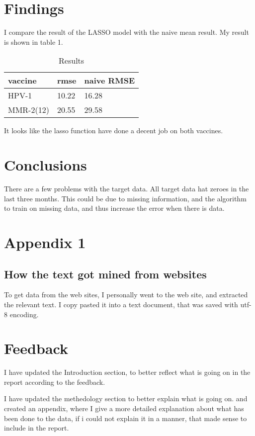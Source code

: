 \documentclass{sig-alternate}
\begin{document}
\section{Findings}
I compare the result of the LASSO model with the naive mean result.
My result is shown in table 1.
\begin{table}[!h]
\centering
\caption{Results}
\label{my-label}
\begin{tabular}{|l|l|l|}
\hline
vaccine   & rmse  & naive RMSE \\ \hline
HPV-1     & 10.22 & 16.28 \\ \hline
MMR-2(12) & 20.55 & 29.58 \\ \hline
\end{tabular}
\end{table}
It looks like the lasso function have done a decent job on both vaccines. 


\section{Conclusions}
There are a few problems with the target data. All target data hat zeroes in the last three months. This could be due to missing information, and the algorithm to train on missing data, and thus increase the error when there is data.

\section{Appendix 1}
\subsection*{How the text got mined from websites}
To get data from the web sites, I personally went to the web site, and extracted the relevant text. I copy pasted it into a text document, that was saved with utf-8 encoding.


\section{Feedback}
I have updated the Introduction section, to better reflect what is going on in the report according to the feedback.

I have updated the methedology section to better explain what is going on. and created an appendix, where I give a more detailed explanation about what has been done to the data, if i could not explain it in a manner, that made sense to include in the report.
\end{document}
